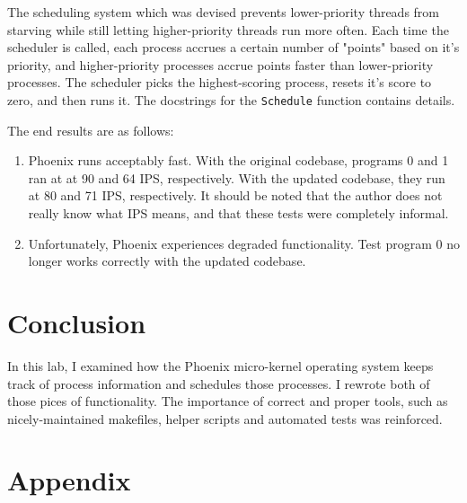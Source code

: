 \documentclass{article}
\begin{document}
The scheduling system which was devised prevents lower-priority threads from
starving while still letting higher-priority threads run more often. Each time
the scheduler is called, each process accrues a certain number of "points" based
on it's priority, and higher-priority processes accrue points faster than
lower-priority processes. The scheduler picks the highest-scoring process,
resets it's score to zero, and then runs it. The docstrings for the
\texttt{Schedule}\label{fix:Schedule} function contains details.

The end results are as follows:

\begin{enumerate}
\item Phoenix runs acceptably fast. With the original codebase, programs 0 and 1
ran at at 90 and 64 IPS, respectively. With the updated codebase, they run at 80
and 71 IPS, respectively. It should be noted that the author does not really
know what IPS means, and that these tests were completely informal.
\item Unfortunately, Phoenix experiences degraded functionality. Test program 0
no longer works correctly with the updated codebase.
\end{enumerate}

\section{Conclusion}
\label{sec:conclusion}

In this lab, I examined how the Phoenix micro-kernel operating system keeps
track of process information and schedules those processes. I rewrote both of
those pices of functionality. The importance of correct and proper tools, such
as nicely-maintained makefiles, helper scripts and automated tests was
reinforced.

\section{Appendix}
\label{sec:appendix}
\end{document}
